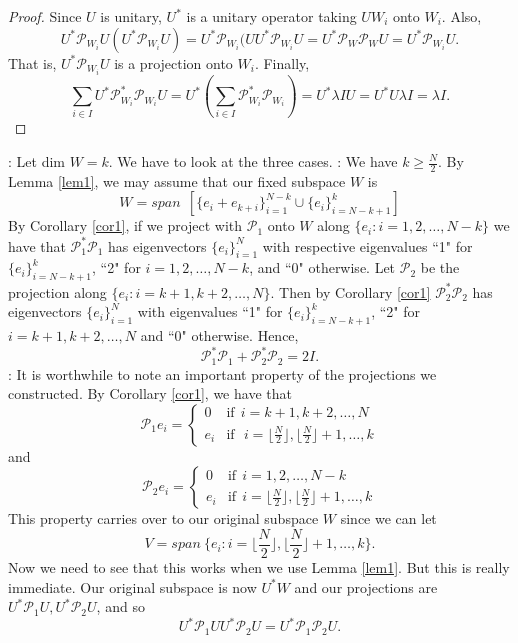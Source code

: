 \documentclass[11pt,reqno]{amsart}
\theoremstyle{remark}
\begin{document}
\begin{proof}
Since $U$ is unitary, $U^{*}$ is a unitary operator taking $UW_i$ onto $W_i$.
Also,
\[ U^{*}{\mathcal P}_{W_i}U(U^{*}{\mathcal P}_{W_i}U) = U^{*}{\mathcal P}_{W_i}(UU^{*}{\mathcal P}_{W_i}U
= U^{*}{\mathcal P}_W{\mathcal P}_WU = U^{*}{\mathcal P}_{W_i}U.\]
That is, $U^*{\mathcal P}_{W_i}U$ is a projection onto $W_i$.
Finally,
\[
\sum_{i\in I}U^{*}{\mathcal P}_{W_i}^{*}{\mathcal P}_{W_i}U = U^{*}\left ( \sum_{i\in I}{\mathcal P}_{W_i}^{*}{\mathcal P}_{W_i}\right )
= U^{*}\lambda IU=  U^{*}U\lambda I= \lambda I.\]
\end{proof}

:
Let dim $W =k$.  We have to look at the three cases.
\vskip12pt
:  We have $k \geq \frac{N}{2}$.
\vskip12pt
By Lemma \ref{lem1}, we may assume that our fixed subspace $W$ is
\[ W = span\ \ [ \{e_i+e_{k+i}\}_{i=1}^{N-k} \cup \{e_i\}_{i=N-k+1}^k] \]
By Corollary \ref{cor1}, if we project with ${\mathcal P}_1$ onto $W$ along $\{e_i:i=1,2,\ldots,N-k\}$
we have that ${\mathcal P}_1^*{\mathcal P}_1$ has eigenvectors $\{e_i\}_{i=1}^N$ with respective
eigenvalues ``1" for $\{e_i\}_{i=N-k+1}^k$, ``2" for $i=1,2,\ldots,N-k$, and ``0"
otherwise.  Let ${\mathcal P}_2$ be the projection along $\{e_i:i= k+1,k+2,\ldots,N\}$.  Then
by Corollary \ref{cor1} ${\mathcal P}_2^{*}{\mathcal P}_2$ has eigenvectors $\{e_i\}_{i=1}^N$ with
eigenvalues ``1" for $\{e_i\}_{i=N-k+1}^k$, ``2" for $i=k+1,k+2,\ldots,N$ and
``0"  otherwise.  Hence,
\[ {\mathcal P}_1^{*}{\mathcal P}_1+{\mathcal P}_2^{*}{\mathcal P}_2 = 2I.\]
\vskip12pt
:  It is worthwhile to note an important property of
the projections we constructed.
By Corollary \ref{cor1}, we have that
\[ {\mathcal P}_1 e_i = \begin{cases} 0 & \mbox{if}\ \ i=k+1,k+2,\ldots,N\\
 e_i & \mbox{if}\ \ \ i=\lfloor \frac{N}{2}\rfloor, \lfloor \frac{N}{2}\rfloor+1,\ldots,k
 \end{cases} \]
and
\[{\mathcal P}_2 e_i = \begin{cases} 0 & \mbox{if}\ \ i = 1,2,\ldots,N-k\\
e_i & \mbox{if}\ \  i=\lfloor \frac{N}{2}\rfloor, \lfloor \frac{N}{2}\rfloor+1,\ldots,k
\end{cases}\]
This property carries over to our original subspace $W$ since we can let
\[ V = span\  \{e_i:i=\lfloor \frac{N}{2}\rfloor, \lfloor \frac{N}{2}\rfloor+1,\ldots,k\}.\]
Now we need to see that this works when we use Lemma \ref{lem1}.  But this
is really immediate.  Our original subspace is now $U^*W$ and our projections
are $U^*{\mathcal P}_1U,U^*{\mathcal P}_2U$, and so
\[ U^*{\mathcal P}_1UU^*{\mathcal P}_2U = U^*{\mathcal P}_1{\mathcal P}_2U.\]
\vskip12pt
\end{document}
